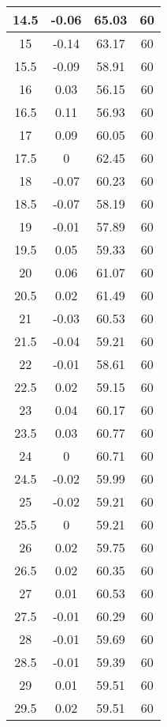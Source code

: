 \begin{longtable}[c]{|c|c|c|c|}
14.5&	-0.06&	65.03  &60 \\ \hline 
15  &	-0.14&	63.17  &60 \\ \hline 
15.5&	-0.09&	58.91  &60 \\ \hline 
16  &	0.03 &	56.15  &60 \\ \hline 
16.5&	0.11 &	56.93  &60 \\ \hline 
17  &	0.09 &	60.05  &60 \\ \hline 
17.5&	0    &	62.45  &60 \\ \hline 
18  &	-0.07&	60.23  &60 \\ \hline 
18.5&	-0.07&	58.19  &60 \\ \hline 
19  &	-0.01&	57.89  &60 \\ \hline 
19.5&	0.05 &	59.33  &60 \\ \hline 
20  &	0.06 &	61.07  &60 \\ \hline 
20.5&	0.02 &	61.49  &60 \\ \hline 
21  &	-0.03&	60.53  &60 \\ \hline 
21.5&	-0.04&	59.21  &60 \\ \hline 
22  &	-0.01&	58.61  &60 \\ \hline 
22.5&	0.02 &	59.15  &60 \\ \hline 
23  &	0.04 &	60.17  &60 \\ \hline 
23.5&	0.03 &	60.77  &60 \\ \hline 
24  &	0    &	60.71  &60 \\ \hline 
24.5&	-0.02&	59.99  &60 \\ \hline 
25  &	-0.02&	59.21  &60 \\ \hline 
25.5&	0    &	59.21  &60 \\ \hline 
26  &	0.02 &	59.75  &60 \\ \hline 
26.5&	0.02 &	60.35  &60 \\ \hline 
27  &	0.01 &	60.53  &60 \\ \hline 
27.5&	-0.01&	60.29  &60 \\ \hline 
28  &	-0.01&	59.69  &60 \\ \hline 
28.5&	-0.01&	59.39  &60 \\ \hline 
29  &	0.01 &	59.51  &60 \\ \hline 
29.5&	0.02 &	59.51  &60 \\ \hline 

\end{longtable}